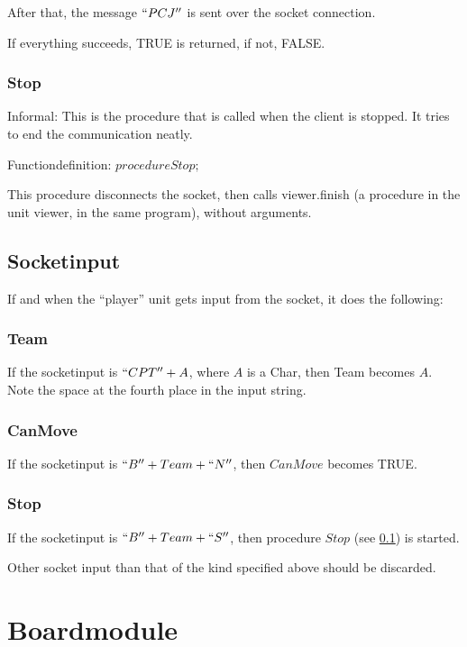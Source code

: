 \documentclass[a4paper,twoside,11pt]{book}
\begin{document}
After that, the message $``PCJ''$ is sent over the socket connection.

If everything succeeds, TRUE is returned, if not, FALSE.

\subsection{Stop}
\label{Stop}
Informal: This is the procedure that is called when the client is stopped. It tries to end the communication neatly.

Functiondefinition: $procedure Stop;$

This procedure disconnects the socket, then calls viewer.finish (a procedure in the unit viewer, in the same program), without arguments.

\section{Socketinput}
\label{player:socketinput}

If and when the ``player'' unit gets input from the socket, it does the following:

\subsection{Team}
If the socketinput is $``CPT '' + A$, where $A$ is a Char, then Team becomes $A$. Note the space at the fourth place in the input string.

\subsection{CanMove}
If the socketinput is $``B'' + Team + ``N''$, then $CanMove$ becomes TRUE.

\subsection{Stop}
If the socketinput is $``B'' + Team + ``S''$, then procedure $Stop$ (see \ref{Stop}) is started.

Other socket input than that of the kind specified above should be discarded.

\chapter{Boardmodule}
\end{document}

